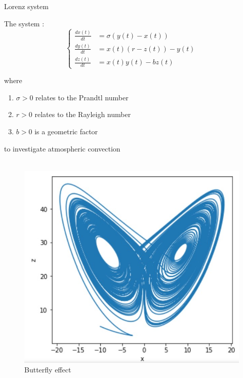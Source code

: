 \documentclass[10pt,xcolor={table,dvipsnames},t]{beamer}
\begin{document}
	\begin{frame}{Lorenz system}
		
		The system :
		$$\left\{\begin{aligned} 
			\frac{d x(t)}{d t} &=\sigma(y(t)-x(t))\\
			\frac{d y(t)}{d t}&=x(t)(r-z(t))-y(t) \\
			\frac{d z(t)}{d t}&=x(t)y(t)-bz(t)
		\end{aligned}\right.$$
	
		\begin{minipage}{0.48\linewidth}
			
			where
			
			\begin{enumerate}[\textbullet]
				\item $\sigma > 0$  relates to the Prandtl number
				\item $r > 0$  relates to the Rayleigh number
				\item $b > 0$ is a geometric factor
			\end{enumerate}
			
			to investigate atmospheric convection \\ \; \\
		\end{minipage}
		\begin{minipage}{0.48\linewidth}
			\begin{figure}
				\centering
				\includegraphics[width=0.65\linewidth]{"images/intro/butterfly.jpg"}
				\caption{Butterfly effect}
			\end{figure}
		\end{minipage}
	\end{frame}
\end{document}
